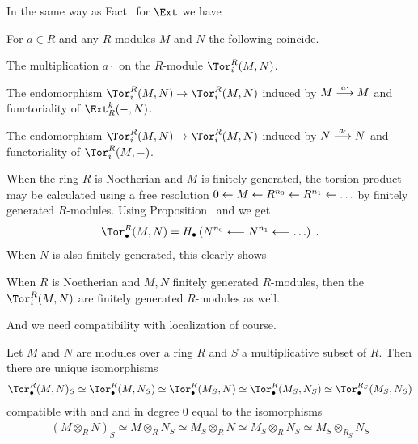 \documentclass[a4paper,parskip=half,numbers=enddot, DIV=12]{scrreprt}
\begin{document}
In the same way as Fact~ for $\Ext$ we have
\begin{fact}
	For $a\in R$ and any $R$-modules $M$ and $N$ the following coincide.
	\begin{alphanumerate}
		\item The multiplication $a\cdot $ on the $R$-module $\Tor_i^R(M,N)$.
		\item The endomorphism $\Tor_i^R(M,N)\morphism\Tor_i^R(M,N)$ induced by $M\morphism[a\cdot ]M$ and functoriality of $\Ext_R^k(-,N)$.
		\item The endomorphism $\Tor_i^R(M,N)\morphism\Tor_i^R(M,N)$ induced by $N\morphism[a\cdot ]N$ and functoriality of $\Tor_i^R(M,-)$.
	\end{alphanumerate}
\end{fact}
When the ring $R$ is Noetherian and $M$ is finitely generated, the torsion product may be calculated using a free resolution $0\lmorphism M\lmorphism R^{n_0}\lmorphism R^{n_1}\lmorphism\ldots$ by finitely generated $R$-modules. Using Proposition~ and  we get
\begin{align*}
	\Tor_\bullet^R(M,N)=H_\bullet\left(N^{n_0}\lmorphism N^{n_1}\lmorphism\ldots\right)\;.
\end{align*}
When $N$ is also finitely generated, this clearly shows
\begin{fact}
	When $R$ is Noetherian  and $M,N$ finitely generated $R$-modules, then the $\Tor_i^R(M,N)$ are finitely generated $R$-modules as well.
\end{fact}
And we need compatibility with localization of course.
\begin{fact}
	Let $M$ and $N$ are modules over a ring $R$ and $S$ a multiplicative subset of $R$. Then there are unique isomorphisms
	\begin{align*}
		\Tor_\bullet^R(M,N)_S\simeq \Tor_\bullet^R(M,N_S)\simeq \Tor_\bullet^R(M_S,N)\simeq \Tor_\bullet^R(M_S,N_S)\simeq \Tor_\bullet^{R_S}(M_S,N_S)
	\end{align*}
	compatible with  and  and in degree $0$ equal to the isomorphisms
	\begin{align*}
		(M\otimes _RN)_S\simeq M\otimes _RN_S\simeq M_S\otimes _RN\simeq M_S\otimes _RN_S\simeq {M_S}\otimes _{R_S}N_S
	\end{align*}
\end{fact}
\end{document}
